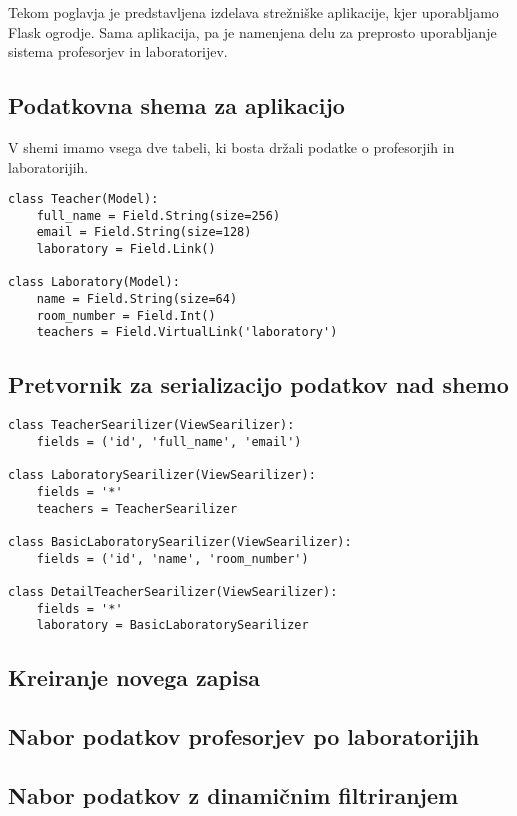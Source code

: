 \documentclass[a4paper,12pt,openright]{book}
\begin{document}
    Tekom poglavja je predstavljena izdelava strežniške aplikacije, kjer uporabljamo Flask \cite{FLASK_GITHUB} ogrodje. Sama aplikacija, pa je namenjena delu za preprosto uporabljanje sistema profesorjev in laboratorijev.
    
    \subsection{Podatkovna shema za aplikacijo}

    V shemi imamo vsega dve tabeli, ki bosta držali podatke o profesorjih in laboratorijih.
\begin{verbatim}
class Teacher(Model):
    full_name = Field.String(size=256)
    email = Field.String(size=128)
    laboratory = Field.Link()

class Laboratory(Model):
    name = Field.String(size=64)
    room_number = Field.Int()
    teachers = Field.VirtualLink('laboratory')
\end{verbatim}

    \newpage
    \subsection{Pretvornik za serializacijo podatkov nad shemo}

\begin{verbatim}
class TeacherSearilizer(ViewSearilizer):
    fields = ('id', 'full_name', 'email')

class LaboratorySearilizer(ViewSearilizer):
    fields = '*'
    teachers = TeacherSearilizer
        
class BasicLaboratorySearilizer(ViewSearilizer):
    fields = ('id', 'name', 'room_number')

class DetailTeacherSearilizer(ViewSearilizer):
    fields = '*'
    laboratory = BasicLaboratorySearilizer
\end{verbatim}

    \subsection{Kreiranje novega zapisa}
    \subsection{Nabor podatkov profesorjev po laboratorijih}
    \subsection{Nabor podatkov z dinamičnim filtriranjem}
\end{document}
